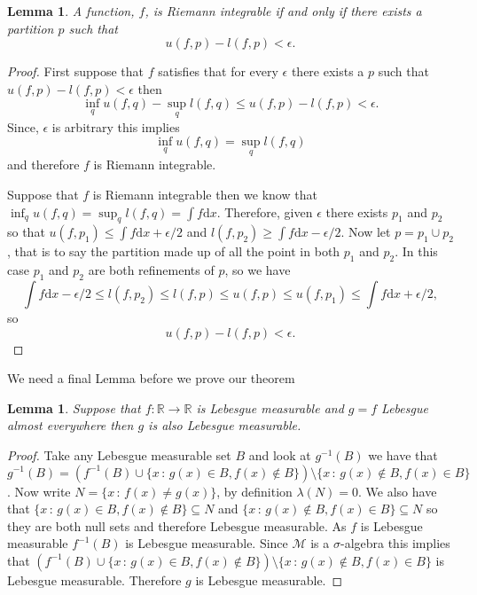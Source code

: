 \documentclass[11pt]{article}
\newtheorem{lem}[thm]{Lemma}
\theoremstyle{definition}
\theoremstyle{remark}
\begin{document}
\begin{lem}
A function, $f$, is Riemann integrable if and only if there exists a partition $p$ such that 
\[ u(f,p) - l(f,p) < \epsilon. \]
\end{lem}
\begin{proof}
First suppose that $f$ satisfies that for every $\epsilon$ there exists a $p$ such that $u(f,p)-l(f,p) < \epsilon$ then 
\[ \inf_q u(f,q) - \sup_q l(f,q) \leq u(f,p)-l(f,p) < \epsilon. \] Since, $\epsilon$ is arbitrary this implies \[ \inf_q u(f,q) = \sup_q l(f,q) \] and therefore $f$ is Riemann integrable.

Suppose that $f$ is Riemann integrable then we know that $\inf_q u(f,q) = \sup_q l(f,q) = \int f \mathrm{d}x$. Therefore, given $\epsilon$ there exists $p_1$ and $p_2$ so that $u(f,p_1) \leq \int f \mathrm{d}x + \epsilon/2$ and $l(f,p_2) \geq \int f \mathrm{d}x - \epsilon/2$. Now let $p = p_1 \cup p_2$, that is to say the partition made up of all the point in both $p_1$ and $p_2$. In this case $p_1$ and $p_2$ are both refinements of $p$, so we have
\[ \int f \mathrm{d}x - \epsilon/2 \leq l(f,p_2) \leq l(f,p) \leq u(f,p) \leq u(f,p_1) \leq \int f \mathrm{d}x + \epsilon/2, \] so
\[ u(f,p)-l(f,p) < \epsilon. \]
\end{proof}
We need a final Lemma before we prove our theorem
\begin{lem}
Suppose that $f: \mathbb{R} \rightarrow \mathbb{R}$ is Lebesgue measurable and $g = f$ Lebesgue almost everywhere then $g$ is also Lebesgue measurable. 
\end{lem}
\begin{proof}
Take any Lebesgue measurable set $B$ and look at $g^{-1}(B)$ we have that $g^{-1}(B) = (f^{-1}(B) \cup \{ x\,:\, g(x) \in B, f(x) \notin B\}) \setminus \{ x \, :\, g(x) \notin B, f(x) \in B\}$. Now write $N = \{ x \,:\, f(x) \neq g(x)\}$, by definition $\lambda(N) = 0$. We also have that $\{ x \,:\, g(x) \in B, f(x) \notin B\} \subseteq N$ and $\{x\,:\, g(x) \notin B, f(x) \in B\} \subseteq N$ so they are both null sets and therefore Lebesgue measurable. As $f$ is Lebesgue measurable $f^{-1}(B)$ is Lebesgue measurable. Since $\mathscr{M}$ is a $\sigma$-algebra this implies that $(f^{-1}(B) \cup \{ x\,:\, g(x) \in B, f(x) \notin B\}) \setminus \{ x \, :\, g(x) \notin B, f(x) \in B\}$ is Lebesgue measurable. Therefore $g$ is Lebesgue measurable.
\end{proof}
\end{document}
